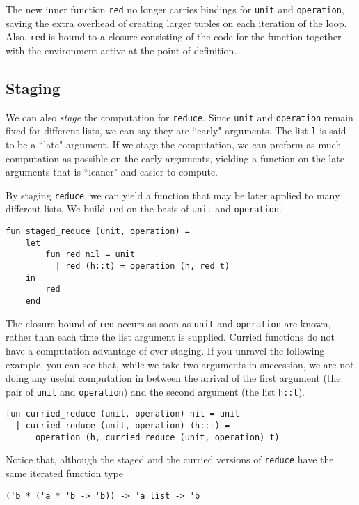 \documentclass[11pt]{article}
\begin{document}
The new inner function \verb~red~ no longer carries bindings for \verb~unit~ and \verb~operation~, saving the extra overhead of creating larger tuples on each iteration of the loop. Also, \verb~red~ is bound to a closure consisting of the code for the function together with the environment active at the point of definition.

\subsection{Staging}

We can also \emph{stage} the computation for \verb~reduce~. Since \verb~unit~ and \verb~operation~ remain fixed for different lists, we can say they are ``early" arguments. The list \verb~l~ is said to be a ``late" argument. If we stage the computation, we can preform as much computation as possible on the early arguments, yielding a function on the late arguments that is ``leaner" and easier to compute.

By staging \verb~reduce~, we can yield a function that may be later applied to many different lists. We build \verb~red~ on the basis of \verb~unit~ and \verb~operation~.

\begin{verbatim}
fun staged_reduce (unit, operation) =
    let
        fun red nil = unit
          | red (h::t) = operation (h, red t)
    in
        red
    end
\end{verbatim}

The closure bound of \verb~red~ occurs as soon as \verb~unit~ and \verb~operation~ are known, rather than each time the list argument is supplied. Curried functions do not have a computation advantage of over staging. If you unravel the following example, you can see that, while we take two arguments in succession, we are not doing any useful computation in between the arrival of the first argument (the pair of \verb~unit~ and \verb~operation~) and the second argument (the list \verb~h::t~).

\begin{verbatim}
fun curried_reduce (unit, operation) nil = unit
  | curried_reduce (unit, operation) (h::t) = 
      operation (h, curried_reduce (unit, operation) t)
\end{verbatim}

Notice that, although the staged and the curried versions of \verb~reduce~ have the same iterated function type

\begin{verbatim}
('b * ('a * 'b -> 'b)) -> 'a list -> 'b
\end{verbatim}
\end{document}
